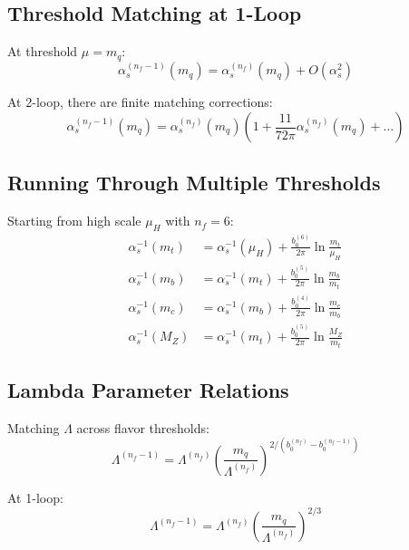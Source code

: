 \documentclass[11pt,a4paper]{article}
\theoremstyle{definition}
\begin{document}
\subsection{Threshold Matching at 1-Loop}
\label{subsec:threshold-1loop}

At threshold $\mu = m_q$:
\begin{equation}
\label{eq:threshold-1loop-match}
\alpha_s^{(n_f-1)}(m_q) = \alpha_s^{(n_f)}(m_q) + O(\alpha_s^2)
\end{equation}

At 2-loop, there are finite matching corrections:
\begin{equation}
\label{eq:threshold-2loop-match}
\alpha_s^{(n_f-1)}(m_q) = \alpha_s^{(n_f)}(m_q)\left(1 + \frac{11}{72\pi}\alpha_s^{(n_f)}(m_q) + \ldots\right)
\end{equation}

\subsection{Running Through Multiple Thresholds}
\label{subsec:multi-threshold}

Starting from high scale $\mu_H$ with $n_f = 6$:
\begin{align}
\label{eq:run-to-mt}
\alpha_s^{-1}(m_t) &= \alpha_s^{-1}(\mu_H) + \frac{b_0^{(6)}}{2\pi}\ln\frac{m_t}{\mu_H} \\
\label{eq:run-to-mb}
\alpha_s^{-1}(m_b) &= \alpha_s^{-1}(m_t) + \frac{b_0^{(5)}}{2\pi}\ln\frac{m_b}{m_t} \\
\label{eq:run-to-mc}
\alpha_s^{-1}(m_c) &= \alpha_s^{-1}(m_b) + \frac{b_0^{(4)}}{2\pi}\ln\frac{m_c}{m_b} \\
\label{eq:run-to-mz}
\alpha_s^{-1}(M_Z) &= \alpha_s^{-1}(m_t) + \frac{b_0^{(5)}}{2\pi}\ln\frac{M_Z}{m_t}
\end{align}

\subsection{Lambda Parameter Relations}
\label{subsec:lambda-relations}

Matching $\Lambda$ across flavor thresholds:
\begin{equation}
\label{eq:lambda-match}
\Lambda^{(n_f-1)} = \Lambda^{(n_f)} \left(\frac{m_q}{\Lambda^{(n_f)}}\right)^{2/(b_0^{(n_f)} - b_0^{(n_f-1)})}
\end{equation}

At 1-loop:
\begin{equation}
\label{eq:lambda-match-1loop}
\Lambda^{(n_f-1)} = \Lambda^{(n_f)} \left(\frac{m_q}{\Lambda^{(n_f)}}\right)^{2/3}
\end{equation}
\end{document}

